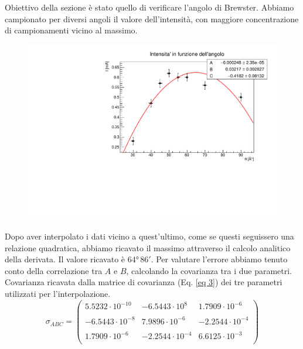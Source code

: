 Obiettivo della sezione è stato quello di verificare l'angolo di Brewster.
\noindent
Abbiamo campionato per diversi angoli il valore dell'intensità, con maggiore concentrazione di campionamenti vicino al massimo.
\begin{figure}[h!]
    \centering
    \includegraphics[scale=.5]{Immagini/browser.pdf}
    \caption{}
    \label{}
\end{figure}
Dopo aver interpolato i dati vicino a quest'ultimo, come se questi seguissero una relazione quadratica, abbiamo ricavato il massimo attraverso il calcolo analitico della derivata. Il valore ricavato è $\ang{64}\, 86'$.
Per valutare l'errore abbiamo tenuto conto della correlazione tra $A$ e $B$, calcolando la covarianza tra i due parametri. Covarianza ricavata dalla matrice di covarianza (Eq. \ref{eq 3}) dei tre parametri utilizzati per l'interpolazione.
\begin{equation}
\sigma_{ABC}=
\begin{pmatrix}
5.5232\cdot 10^{-10} & -6.5443\cdot 10^{8} &
1.7909\cdot 10^{-6}\\
\\
-6.5443\cdot 10^{-8} &
7.9896\cdot 10^{-6} & -2.2544\cdot 10^{-4}\\
\\
1.7909\cdot 10^{-6} & -2.2544\cdot 10^{-4} &
6.6125\cdot 10^{-3}\\
\end{pmatrix}
\label{eq 3}
\end{equation}


